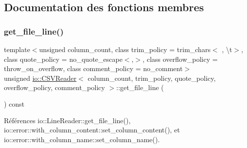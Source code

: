 \subsection{Documentation des fonctions membres}
\mbox{\label{classio_1_1CSVReader_a065f805596018d1568b81152e6a22e0c}} 
\subsubsection{\texorpdfstring{get\+\_\+file\+\_\+line()}{get\_file\_line()}}
{\footnotesize\ttfamily template$<$unsigned column\+\_\+count, class trim\+\_\+policy  = trim\+\_\+chars$<$\textquotesingle{} \textquotesingle{}, \textquotesingle{}\textbackslash{}t\textquotesingle{}$>$, class quote\+\_\+policy  = no\+\_\+quote\+\_\+escape$<$\textquotesingle{},\textquotesingle{}$>$, class overflow\+\_\+policy  = throw\+\_\+on\+\_\+overflow, class comment\+\_\+policy  = no\+\_\+comment$>$ \\
unsigned \hyperlink{classio_1_1CSVReader}{io\+::\+C\+S\+V\+Reader}$<$ column\+\_\+count, trim\+\_\+policy, quote\+\_\+policy, overflow\+\_\+policy, comment\+\_\+policy $>$\+::get\+\_\+file\+\_\+line (\begin{DoxyParamCaption}{ }\end{DoxyParamCaption}) const\hspace{0.3cm}{\ttfamily [inline]}}



Références io\+::\+Line\+Reader\+::get\+\_\+file\+\_\+line(), io\+::error\+::with\+\_\+column\+\_\+content\+::set\+\_\+column\+\_\+content(), et io\+::error\+::with\+\_\+column\+\_\+name\+::set\+\_\+column\+\_\+name().

\mbox{\label{classio_1_1CSVReader_abc6321895152f5a34959b499da6512ee}} 
